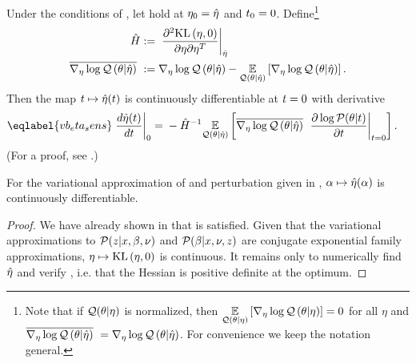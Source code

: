 \begin{thm}
%
Under the conditions of , let  hold at $\eta_0 = \hat\eta$ and $t_0 = 0$.
Define\footnote{Note that if $\mathcal{Q}(\theta \vert \eta)$ is normalized, then
$\underset{\mathcal{Q}(\theta \vert \eta)}{\mathbb{E}}\left[{\nabla_\eta \log \mathcal{Q}}\left(\theta \vert \eta\right)\right] = 0$ for all $\eta$
and $\overline{{\nabla_\eta \log \mathcal{Q}}\left(\theta \vert \hat\eta\right)}\,\, = {\nabla_\eta \log \mathcal{Q}}\left(\theta \vert \hat\eta\right)$.  For
convenience we keep the notation general.}
%
\begin{align*}
%
\hessopt :={}& \fracat{\partial^2 \KL{\eta, 0}}
                {\partial \eta \partial \eta^T}
                {\etaopt} \\
\lqgradbar{\theta \vert \etaopt} :={}&
    \lqgrad{\theta \vert \etaopt} -
    \expect{\q(\theta \vert \etaopt)}{\lqgrad{\theta \vert \etaopt}}.
%
\end{align*}
%
Then the map $t \mapsto \hat\eta(t)$ is continuously differentiable at $t=0$
with derivative
%
\begin{align}\eqlabel{vb_eta_sens}
%
\fracat{d \etaopt(\t)}{d \t}{0} ={}&
    - \hessopt^{-1}
    \expect{\q(\theta \vert \etaopt)}{
        \lqgradbar{\theta \vert \etaopt}
        \fracat{\partial \log \p(\theta \vert \t)}{\partial \t}{\t=0}
    }.
%
\end{align}
%
(For a proof, see  .)
%
\end{thm}


\begin{cor}
%
For the variational approximation of  and perturbation
given in , $\alpha \mapsto \hat\eta(\alpha)$
is continuously differentiable.
%
\begin{proof}
%
We have already shown in  that  is
satisfied.  Given that the variational approximations to $\mathcal{P}(z \vert x, \beta,
\nu)$ and $\mathcal{P}(\beta \vert x, \nu, z)$ are conjugate exponential family
approximations, $\eta \mapsto \mathrm{KL}\left(\eta, 0\right)$ is continuous.  It remains only to
numerically find $\hat\eta$ and verify , i.e.
that the Hessian is positive definite at the optimum.
%
\end{proof}
%
\end{cor}

